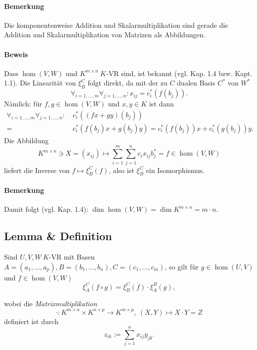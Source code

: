 \paragraph{Bemerkung}
	Die komponentenweise Addition und Skalarmultiplikation sind gerade die Addition und Skalarmultiplikation von Matrizen als Abbildungen.
	
\paragraph{Beweis}
	Dass $ \hom(V,W) $ und $ K^{m\times n} \ K $-VR sind, ist bekannt (vgl. Kap. 1.4 bzw. Kapt. 1.1). Die Linearität von $ \xi_B^C $ folgt direkt, da mit der zu $ C $ dualen Basis $ C^* $ von $ W^* $
		\[ \forall_{i=1,\dots,m} \forall_{j=1,\dots,n}: x_{ij}= c_i^*(f(b_j)). \]
	Nämlich: für $ f,g\in \hom(V,W) $ und $ x,y\in K $ ist dann
		\begin{align*}
			\forall_{i= 1,\dots,m} \forall_{j=1,\dots, n} :\ &c_i^*((fx+gy)(b_j))\\
			=\ &c_i^*(f(b_j)x+g(b_j)y) = c_i^*(f(b_j))x+c_i^*(g(b_j))y.
		\end{align*}
	Die Abbildung
		\[ K^{m\times n}\ni X=(x_{ij})\mapsto \sum_{i=1}^{m}\sum_{j=1}^{n}c_ix_{ij}b_j^* = f\in \hom(V,W) \]
	liefert die Inverse von $ f\mapsto\xi_B^C(f) $, also ist $ \xi_B^C $ ein Isomorphismus.
\paragraph{Bemerkung}
	Damit folgt (vgl. Kap. 1.4): $ \dim \hom(V,W) = \dim K^{m\times n} = m\cdot n $.
\subsection{Lemma \& Definition}
	\begin{Lemma}
	Sind $ U,V,W \ K$-VR mit Basen $ A=(a_1,\dots,a_p),B=(b_1,\dots,b_n),C=(c_1,\dots,c_m) $, so gilt für $ g\in \hom(U,V) $ und $ f\in \hom(V,W) $
		\[ \xi_A^C(f\circ g) = \xi_B^C(f)\cdot \xi_A^B(g), \]
	\end{Lemma}
	\begin{Definition}
	wobei die \emph{Matrixmultiplikation}
		\[ \cdot:K^{m\times n}\times K^{n\times p} \to K^{m\times p},\ (X,Y)\mapsto X\cdot Y = Z \]
	definiert ist durch
		\[ z_{ik} := \sum_{j=1}^{n}x_{ij}y_{jk}. \]
	\end{Definition}
